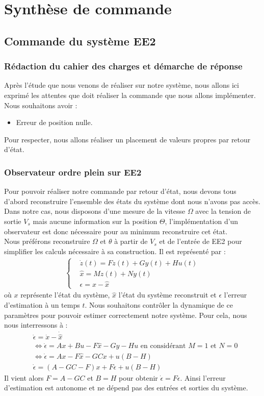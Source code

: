 \chapter{Synthèse de commande}
\label{chap:commande}
\section{Commande du système EE2}
\subsection{Rédaction du cahier des charges et démarche de réponse}
Après l'étude que nous venons de réaliser sur notre système, nous allons ici exprimé les attentes que doit réaliser la commande que nous allons implémenter. Nous souhaitons avoir : \begin{itemize} 
\item Erreur de position nulle.
\end{itemize}
Pour respecter, nous allons réaliser un placement de valeurs propres par retour d'état.
\subsection{Observateur ordre plein sur EE2}
Pour pouvoir réaliser notre commande par retour d'état, nous devons tous d'abord reconstruire l'ensemble des états du système dont nous n'avons pas accès. Dans notre cas, nous disposons d'une mesure de la vitesse $\Omega$ avec la tension de sortie $V_s$ mais aucune information sur la position $\Theta$, l'implémentation d'un observateur est donc nécessaire pour au minimum reconstruire cet état.\\
Nous préférons reconstruire $\Omega$ et $\theta$ à partir de $V_s$ et de l'entrée de EE2 pour simplifier les calculs nécessaire à sa construction. Il est représenté par :
\begin{align*}
\left\lbrace
\begin{aligned}
&\dot z (t) = Fz(t) + Gy(t) + Hu(t)\\
&\hat x = Mz(t) + Ny(t)\\
&\epsilon = x-\hat{x}
\end{aligned}
\right.
\end{align*} où $x$ représente l'état du système, $\hat{x}$ l'état du système reconstruit et $\epsilon$ l'erreur d'estimation à un temps $t$. Nous souhaitons contrôler la dynamique de ce paramètres pour pouvoir estimer correctement notre système. Pour cela, nous nous interressons à : \begin{align*}
&\dot{\epsilon} = \dot{x} - \dot{\hat{x}}\\
&\Leftrightarrow \dot{\epsilon} = Ax +Bu - F\hat{x} - Gy - Hu 
\text{   en considérant }M=1 \text{ et } N = 0\\
& \Leftrightarrow \dot{\epsilon} = Ax - F\hat{x} - GCx + u(B-H)\\
& \dot{\epsilon} = (A-GC-F)x + F\epsilon + u(B-H)
\end{align*} 
Il vient alors $F = A-GC$ et $B=H$ pour obtenir $\dot{\epsilon} = F\epsilon$. Ainsi l'erreur d'estimation est autonome et ne dépend pas des entrées et sorties du système.


